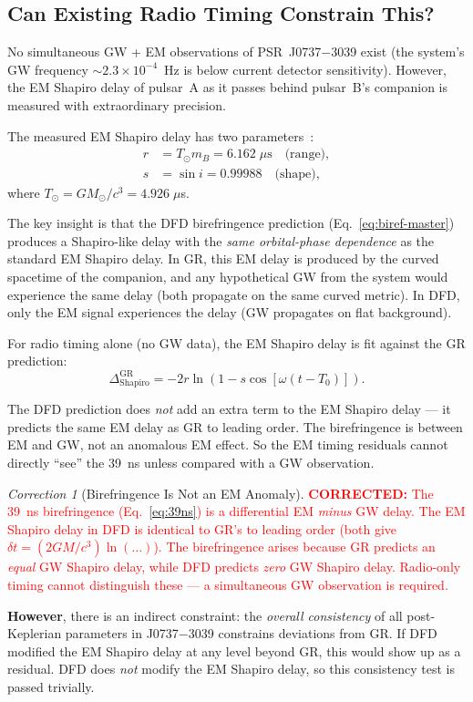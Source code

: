 \documentclass[11pt]{article}
\theoremstyle{definition}
\theoremstyle{remark}
\newtheorem{correction}[theorem]{Correction}
\newcommand{\ee}[1]{\times10^{#1}}
\newcommand{\corrected}[1]{\textcolor{red}{\textbf{CORRECTED:} #1}}
\begin{document}
\subsection{Can Existing Radio Timing Constrain This?}

No simultaneous GW + EM observations of PSR~J0737$-$3039 exist (the
system's GW frequency $\sim 2.3\ee{-4}$~Hz is below current detector
sensitivity). However, the EM Shapiro delay of pulsar~A as it passes
behind pulsar~B's companion is measured with extraordinary precision.

The measured EM Shapiro delay has two parameters~\cite{Kramer2021}:
\begin{align}
r &= T_\odot m_B = 6.162\;\mu\mathrm{s} \quad\text{(range)}, \\
s &= \sin i = 0.99988 \quad\text{(shape)},
\end{align}
where $T_\odot = GM_\odot/c^3 = 4.926\;\mu$s.

The key insight is that the DFD birefringence prediction
(Eq.~\ref{eq:biref-master}) produces a Shapiro-like delay with the
\emph{same orbital-phase dependence} as the standard EM Shapiro delay.
In GR, this EM delay is produced by the curved spacetime of the
companion, and any hypothetical GW from the system would experience the
same delay (both propagate on the same curved metric). In DFD, only
the EM signal experiences the delay (GW propagates on flat
background).

For radio timing alone (no GW data), the EM Shapiro delay is fit
against the GR prediction:
\begin{equation}
\Delta_{\mathrm{Shapiro}}^{\mathrm{GR}} = -2 r \ln\left(
1 - s \cos\left[\omega(t - T_0)\right]\right).
\end{equation}

The DFD prediction does \emph{not} add an extra term to the EM Shapiro
delay --- it predicts the same EM delay as GR to leading order. The
birefringence is between EM and GW, not an anomalous EM effect. So the
EM timing residuals cannot directly ``see'' the 39~ns unless compared
with a GW observation.

\begin{correction}[Birefringence Is Not an EM Anomaly]
\label{cor:not-em-anomaly}
\corrected{The 39~ns birefringence (Eq.~\ref{eq:39ns}) is a
differential EM \emph{minus} GW delay. The EM Shapiro delay in DFD
is identical to GR's to leading order (both give
$\delta t = (2GM/c^3)\ln(\ldots)$). The birefringence arises
because GR predicts an \emph{equal} GW Shapiro delay, while DFD
predicts \emph{zero} GW Shapiro delay. Radio-only timing cannot
distinguish these --- a simultaneous GW observation is required.}

\textbf{However}, there is an indirect constraint: the \emph{overall
consistency} of all post-Keplerian parameters in J0737$-$3039
constrains deviations from GR. If DFD modified the EM Shapiro delay
at any level beyond GR, this would show up as a residual. DFD does
\emph{not} modify the EM Shapiro delay, so this consistency test is
passed trivially.
\end{correction}
\end{document}
